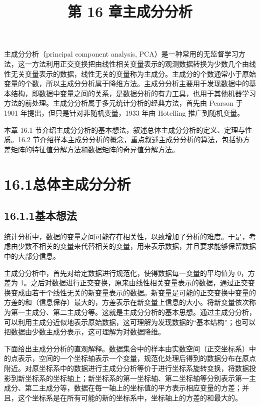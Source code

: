 \documentclass[UTF8, 12pt, fontset=fandol, oneside]{ctexart}
\title{第 16 章\quad 主成分分析}
\author{}
\date{}
\begin{document}
\maketitle

主成分分析（principal component analysis, PCA）是一种常用的无监督学习方法，这一方法利用正交变换把由线性相关变量表示的观测数据转换为少数几个由线性无关变量表示的数据，线性无关的变量称为主成分。主成分的个数通常小于原始变量的个数，所以主成分分析属于降维方法。主成分分析主要用于发现数据中的基本结构，即数据中变量之间的关系，是数据分析的有力工具，也用于其他机器学习方法的前处理。主成分分析属于多元统计分析的经典方法，首先由 Pearson 于 1901 年提出，但只是针对非随机变量，1933 年由 Hotelling 推广到随机变量。

本章 16.1 节介绍主成分分析的基本想法，叙述总体主成分分析的定义、定理与性质。16.2 节介绍样本主成分分析的概念，重点叙述主成分分析的算法，包括协方差矩阵的特征值分解方法和数据矩阵的奇异值分解方法。

\section*{16.1\quad 总体主成分分析}

\subsection*{16.1.1\quad 基本想法}

统计分析中，数据的变量之间可能存在相关性，以致增加了分析的难度。于是，考虑由少数不相关的变量来代替相关的变量，用来表示数据，并且要求能够保留数据中的大部分信息。

主成分分析中，首先对给定数据进行规范化，使得数据每一变量的平均值为 0，方差为 1。之后对数据进行正交变换，原来由线性相关变量表示的数据，通过正交变换变成由若干个线性无关的新变量表示的数据。新变量是可能的正交变换中变量的方差的和（信息保存）最大的，方差表示在新变量上信息的大小。将新变量依次称为第一主成分、第二主成分等。这就是主成分分析的基本思想。通过主成分分析，可以利用主成分近似地表示原始数据，这可理解为发现数据的“基本结构”；也可以把数据由少数主成分表示，这可理解为对数据降维。

下面给出主成分分析的直观解释。数据集合中的样本由实数空间（正交坐标系）中的点表示，空间的一个坐标轴表示一个变量，规范化处理后得到的数据分布在原点附近。对原坐标系中的数据进行主成分分析等价于进行坐标系旋转变换，将数据投影到新坐标系的坐标轴上；新坐标系的第一坐标轴、第二坐标轴等分别表示第一主成分、第二主成分等，数据在每一轴上的坐标值的平方表示相应变量的方差；并且，这个坐标系是在所有可能的新的坐标系中，坐标轴上的方差的和最大的。
\end{document}
